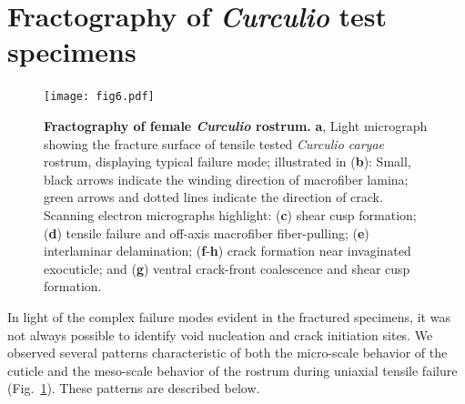 \documentclass[twocolumn, linenumbers, superscriptaddress, nofootinbib]{revtex4-1}
\begin{document}
	\section{Fractography of \textit{Curculio} test specimens}
		
		\begin{figure}
			\centering
			\texttt{[image: fig6.pdf]}
			\caption{\textbf{Fractography of female \textit{Curculio} rostrum.}
				\textbf{a}, Light micrograph showing the fracture surface of tensile tested \textit{Curculio caryae} rostrum, displaying typical failure mode; illustrated in (\textbf{b}):
				Small, black arrows indicate the winding direction of macrofiber lamina; green arrows and dotted lines indicate the direction of crack.
				Scanning electron micrographs highlight: (\textbf{c}) shear cusp formation; (\textbf{d}) tensile failure and off-axis macrofiber fiber-pulling; (\textbf{e}) interlaminar delamination; (\textbf{f}-\textbf{h}) crack formation near invaginated exocuticle; and (\textbf{g}) ventral crack-front coalescence and shear cusp formation.
			}
			\label{fig::fracture}
		\end{figure}
		
		In light of the complex failure modes evident in the fractured specimens, it was not always possible to identify void nucleation and crack initiation sites.
		We observed several patterns characteristic of both the micro-scale behavior of the cuticle and the meso-scale behavior of the rostrum during uniaxial tensile failure (Fig.~\ref{fig::fracture}).
		These patterns are described below.
		
\end{document}
